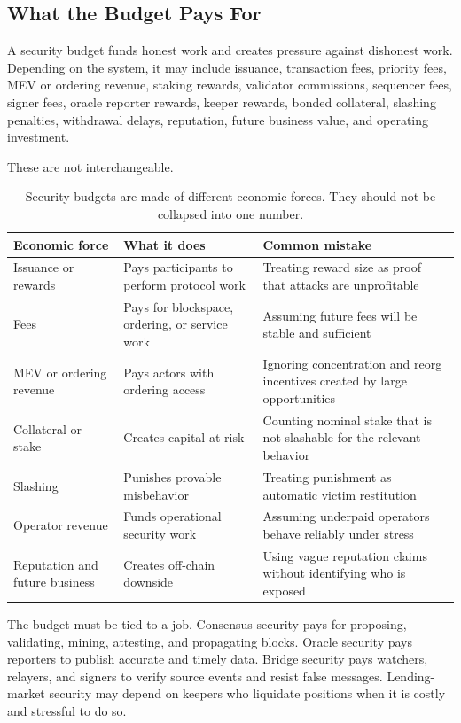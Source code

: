 \subsection{What the Budget Pays For}

A security budget funds honest work and creates pressure against dishonest work. Depending on the system, it may include issuance, transaction fees, priority fees, MEV or ordering revenue, staking rewards, validator commissions, sequencer fees, signer fees, oracle reporter rewards, keeper rewards, bonded collateral, slashing penalties, withdrawal delays, reputation, future business value, and operating investment.

These are not interchangeable.

\begin{table}[htbp]
\centering
\small
\renewcommand{\arraystretch}{1.16}
\begin{tabularx}{\textwidth}{@{}>{\RaggedRight\arraybackslash}p{}>{\RaggedRight\arraybackslash}p{}X@{}}
\toprule
Economic force & What it does & Common mistake \\
\midrule
Issuance or rewards & Pays participants to perform protocol work & Treating reward size as proof that attacks are unprofitable \\
Fees & Pays for blockspace, ordering, or service work & Assuming future fees will be stable and sufficient \\
MEV or ordering revenue & Pays actors with ordering access & Ignoring concentration and reorg incentives created by large opportunities \\
Collateral or stake & Creates capital at risk & Counting nominal stake that is not slashable for the relevant behavior \\
Slashing & Punishes provable misbehavior & Treating punishment as automatic victim restitution \\
Operator revenue & Funds operational security work & Assuming underpaid operators behave reliably under stress \\
Reputation and future business & Creates off-chain downside & Using vague reputation claims without identifying who is exposed \\
\bottomrule
\end{tabularx}
\caption{Security budgets are made of different economic forces. They should not be collapsed into one number.}
\end{table}

The budget must be tied to a job. Consensus security pays for proposing, validating, mining, attesting, and propagating blocks. Oracle security pays reporters to publish accurate and timely data. Bridge security pays watchers, relayers, and signers to verify source events and resist false messages. Lending-market security may depend on keepers who liquidate positions when it is costly and stressful to do so.

